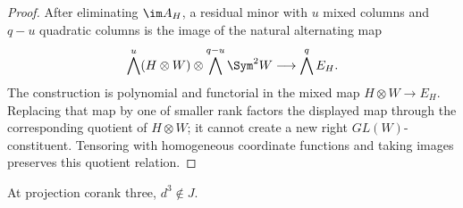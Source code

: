 \begin{proof}
After eliminating \(\im A_H\), a residual minor with \(u\)
mixed columns and \(q-u\) quadratic columns is the image of the
natural alternating map
\[
 \bigwedge^u(H\otimes W)\otimes
 \bigwedge^{q-u}\Sym^2W
 \longrightarrow \bigwedge^q E_H.
\]
The construction is polynomial and functorial in the mixed map
\(H\otimes W\to E_H\).  Replacing that map by one of smaller
rank factors the displayed map through the corresponding quotient of
\(H\otimes W\); it cannot create a new right
\(GL(W)\)-constituent.  Tensoring with homogeneous coordinate
functions and taking images preserves this quotient relation.
\end{proof}
\begin{lemma}
\label{lem:no-d3-corank3}
At projection corank three, \(d^3\notin J\).
\end{lemma}


